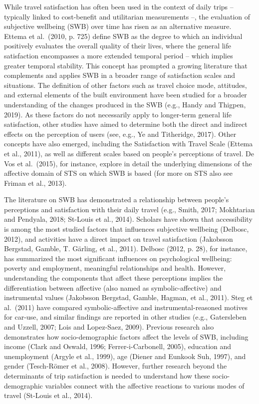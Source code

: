 \documentclass[]{elsarticle} %
\begin{document}
While travel satisfaction has often been used in the context of daily
trips -- typically linked to cost-benefit and utilitarian measurements
--, the evaluation of subjective wellbeing (SWB) over time has risen as
an alternative measure. Ettema et al.~(2010, p. 725) define SWB as the
degree to which an individual positively evaluates the overall quality
of their lives, where the general life satisfaction encompasses a more
extended temporal period -- which implies greater temporal stability.
This concept has prompted a growing literature that complements and
applies SWB in a broader range of satisfaction scales and situations.
The definition of other factors such as travel choice mode, attitudes,
and external elements of the built environment have been studied for a
broader understanding of the changes produced in the SWB (e.g., Handy
and Thigpen, 2019). As these factors do not necessarily apply to
longer-term general life satisfaction, other studies have aimed to
determine both the direct and indirect effects on the perception of
users (see, e.g., Ye and Titheridge, 2017). Other concepts have also
emerged, including the Satisfaction with Travel Scale (Ettema et al.,
2011), as well as different scales based on people's perceptions of
travel. De Vos et al.~(2015), for instance, explore in detail the
underlying dimensions of the affective domain of STS on which SWB is
based (for more on STS also see Friman et al., 2013).

The literature on SWB has demonstrated a relationship between people's
perceptions and satisfaction with their daily travel (e.g., Smith, 2017;
Mokhtarian and Pendyala, 2018; St-Louis et al., 2014). Scholars have
shown that accessibility is among the most studied factors that
influences subjective wellbeing (Delbosc, 2012), and activities have a
direct impact on travel satisfaction (Jakobsson Bergstad, Gamble, T.
Gärling, et al., 2011). Delbosc (2012, p. 28), for instance, has
summarized the most significant influences on psychological wellbeing:
poverty and employment, meaningful relationships and health. However,
understanding the components that affect these perceptions implies the
differentiation between affective (also named as symbolic-affective) and
instrumental values (Jakobsson Bergstad, Gamble, Hagman, et al., 2011).
Steg et al.~(2011) have compared symbolic-affective and
instrumental-reasoned motives for car-use, and similar findings are
reported in other studies (e.g., Gatersleben and Uzzell, 2007; Lois and
Lopez-Saez, 2009). Previous research also demonstrates how
socio-demographic factors affect the levels of SWB, including income
(Clark and Oswald, 1996; Ferrer-i-Carbonell, 2005), education and
unemployment (Argyle et al., 1999), age (Diener and Eunkook Suh, 1997),
and gender (Tesch-Römer et al., 2008). However, further research beyond
the determinants of trip satisfaction is needed to understand how these
socio-demographic variables connect with the affective reactions to
various modes of travel (St-Louis et al., 2014).
\end{document}
